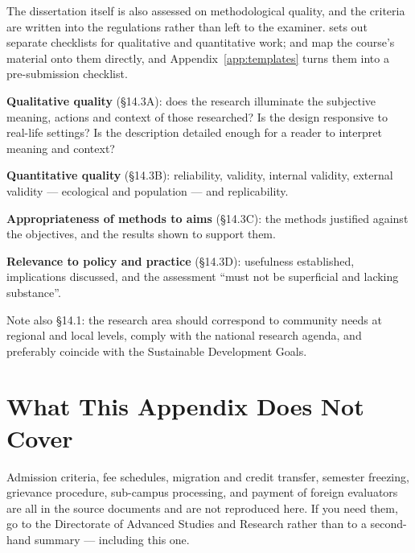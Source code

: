 The dissertation itself is also assessed on methodological quality, and the
criteria are written into the regulations rather than left to the examiner.
 sets out separate checklists for qualitative and
quantitative work;  and  map the course's material
onto them directly, and Appendix~\ref{app:templates} turns them into a
pre-submission checklist.

\begin{conceptbox}
\begin{tightnum}
  \item \textbf{Qualitative quality} (\S14.3A): does the research illuminate
    the subjective meaning, actions and context of those researched? Is the
    design responsive to real-life settings? Is the description detailed enough
    for a reader to interpret meaning and context?
  \item \textbf{Quantitative quality} (\S14.3B): reliability, validity,
    internal validity, external validity --- ecological and population --- and
    replicability.
  \item \textbf{Appropriateness of methods to aims} (\S14.3C): the methods
    justified against the objectives, and the results shown to support them.
  \item \textbf{Relevance to policy and practice} (\S14.3D): usefulness
    established, implications discussed, and the assessment ``must not be
    superficial and lacking substance''.
\end{tightnum}
\medskip
Note also \S14.1: the research area should correspond to community needs at
regional and local levels, comply with the national research agenda, and
preferably coincide with the Sustainable Development Goals.
\end{conceptbox}

\section{What This Appendix Does Not Cover}

Admission criteria, fee schedules, migration and credit transfer, semester
freezing, grievance procedure, sub-campus processing, and payment of foreign
evaluators are all in the source documents and are not reproduced here. If you
need them, go to the Directorate of Advanced Studies and Research rather than
to a second-hand summary --- including this one.
